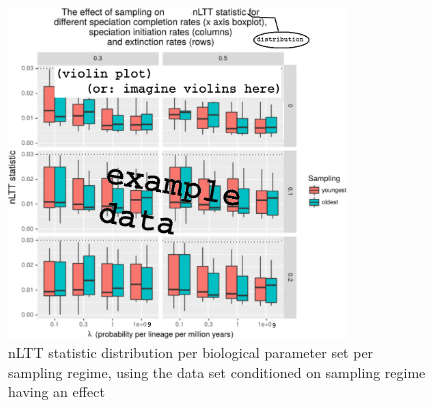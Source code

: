 \documentclass{article}
\begin{document}
\begin{figure}[!htbp]
  \includegraphics[width=0.8\textwidth]{fig_sampling.png}
  \caption{
    nLTT statistic distribution per biological parameter set per sampling
    regime, using the data set conditioned on sampling regime having an effect 
  }
\end{figure}

\end{document}
